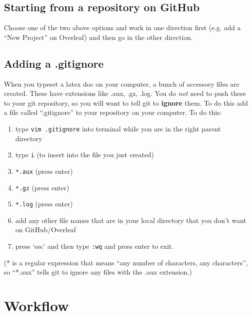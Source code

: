 \documentclass[10pt]{article}
\begin{document}
\subsection{Starting from a repository on GitHub}
Choose one of the two above options and work in one direction first (e.g. add a ``New Project'' on Overleaf) and then go in the other direction.

\subsection{Adding a .gitignore}
When you typeset a latex doc on your computer, a bunch of accessory files are created. These have extensions like .aux, .gz, .log. You do \emph{not} need to push these to your git repository, so you will want to tell git to \textbf{ignore} them. To do this add a file called ``.gitignore'' to your repository on your computer. To do this: 
\begin{enumerate}
\item type \texttt{vim .gitignore} into terminal while you are in the right parent directory
\item type \texttt{i} (to insert into the file you just created)
\item \texttt{*.aux} (press enter)
\item \texttt{*.gz} (press enter)
\item \texttt{*.log} (press enter)
\item add any other file names that are in your local directory that you don't want on GitHub/Overleaf
\item press `esc' and then type \texttt{:wq} and press enter to exit.
\end{enumerate}
(* is a regular expression that means ``any number of characters, any characters'', so ``*.aux'' tells git to ignore any files with the .aux extension.)

\section{Workflow}
\end{document}
